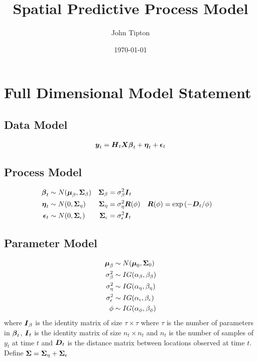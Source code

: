 \documentclass[fleqn]{article}
\title{Spatial Predictive Process Model}
\author{John Tipton}
\date{\today}
\def\bm#1{\mbox{\boldmath $#1$}}
\begin{document}
\maketitle

\section{Full Dimensional Model Statement}
%
\subsection{Data Model}
\begin{align*}
\bm{y}_t & = \bm{H}_t \bm{X} \bm{\beta}_t + \bm{\eta}_t + \bm{\epsilon}_t\\
%
\end{align*}
%
\subsection{Process Model}
%
\begin{align*}
%
\bm{\beta}_t & \sim N(\bm{\mu}_\beta, \bm{\Sigma}_\beta) & \bm{\Sigma}_\beta &  = \sigma^2_\beta \bm{I}_t\\
%
\bm{\eta}_t & \sim N(0, \bm{\Sigma}_\eta) & \bm{\Sigma}_\eta &  = \sigma^2_\eta \bm{R}(\phi) & \bm{R}(\phi) & = \exp{( - \bm{D}_t / \phi)}\\
%
\bm{\epsilon}_t & \sim N(0, \bm{\Sigma}_\epsilon) & \bm{\Sigma}_\epsilon &  = \sigma^2_\epsilon \bm{I}_t\\
%
\end{align*}
%
\subsection{Parameter Model}
%
\begin{align*}
%
\bm{\mu}_\beta & \sim N(\bm{\mu}_0, \bm{\Sigma}_0)\\
%
\sigma^2_\beta & \sim IG(\alpha_\beta, \beta_\beta)\\
%
\sigma^2_\eta & \sim IG(\alpha_\eta, \beta_\eta)\\
%
\sigma^2_\epsilon & \sim IG(\alpha_\epsilon, \beta_\epsilon)\\
%
\phi & \sim IG(\alpha_\phi, \beta_\phi)
\end{align*}
%
where $\bm{I}_\beta$ is the identity matrix of size $\tau \times \tau$ where $\tau$ is the number of parameters in $\bm{\beta}_t$, $\bm{I}_t$ is the identity matrix of size $n_t \times n_t$ and $n_t$ is the number of samples of $y_t$ at time $t$ and $\bm{D}_t$ is the distance matrix between locations observed at time $t$. Define $\bm{\Sigma} = \bm{\Sigma}_\eta + \bm{\Sigma}_\epsilon$
%
\end{document}
